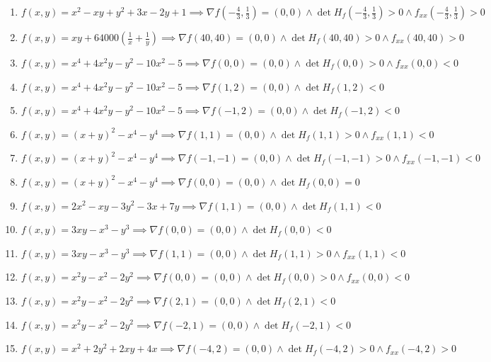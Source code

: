 \documentclass[11pt,a4paper]{article}
\begin{document}
\begin{enumerate}
\item $\displaystyle f(x, y) = x^{2} - xy + y^{2} + 3x - 2y + 1 \implies \nabla f\left( -\frac{4}{3}, \frac{1}{3} \right) = (0, 0) \land \det H_{f}\left( -\frac{4}{3}, \frac{1}{3} \right) > 0 \land f_{xx}\left( -\frac{4}{3}, \frac{1}{3} \right) > 0$
\item $\displaystyle f(x, y) = xy + 64000\left( \frac{1}{x} + \frac{1}{y} \right) \implies \nabla f(40, 40) = (0, 0) \land \det H_{f}(40, 40) > 0 \land f_{xx}(40, 40) > 0$
\item $\displaystyle f(x, y) = x^{4} + 4x^{2} y - y^{2} - 10x^{2} - 5 \implies \nabla f(0, 0) = (0, 0) \land \det H_{f}(0, 0) > 0 \land f_{xx}(0, 0) < 0$
\item $\displaystyle f(x, y) = x^{4} + 4x^{2} y - y^{2} - 10x^{2} - 5 \implies \nabla f(1, 2) = (0, 0) \land \det H_{f}(1, 2) < 0$
\item $\displaystyle f(x, y) = x^{4} + 4x^{2} y - y^{2} - 10x^{2} - 5 \implies \nabla f(-1, 2) = (0, 0) \land \det H_{f}(-1, 2) < 0$
\item $\displaystyle f(x, y) = (x + y)^{2} - x^{4} - y^{4} \implies \nabla f(1, 1) = (0, 0) \land \det H_{f}(1, 1) > 0 \land f_{xx}(1, 1) < 0$
\item $\displaystyle f(x, y) = (x + y)^{2} - x^{4} - y^{4} \implies \nabla f(-1, -1) = (0, 0) \land \det H_{f}(-1, -1) > 0 \land f_{xx}(-1, -1) < 0$
\item $\displaystyle f(x, y) = (x + y)^{2} - x^{4} - y^{4} \implies \nabla f(0, 0) = (0, 0) \land \det H_{f}(0, 0) = 0$
\item $\displaystyle f(x, y) = 2x^{2} - xy - 3y^{2} - 3x + 7y \implies \nabla f(1, 1) = (0, 0) \land \det H_{f}(1, 1) < 0$
\item $\displaystyle f(x, y) = 3xy - x^{3} - y^{3} \implies \nabla f(0, 0) = (0, 0) \land \det H_{f}(0, 0) < 0$
\item $\displaystyle f(x, y) = 3xy - x^{3} - y^{3} \implies \nabla f(1, 1) = (0, 0) \land \det H_{f}(1, 1) > 0 \land f_{xx}(1, 1) < 0$
\item $\displaystyle f(x, y) = x^{2} y - x^{2} - 2y^{2} \implies \nabla f(0, 0) = (0, 0) \land \det H_{f}(0, 0) > 0 \land f_{xx}(0, 0) < 0$
\item $\displaystyle f(x, y) = x^{2} y - x^{2} - 2y^{2} \implies \nabla f(2, 1) = (0, 0) \land \det H_{f}(2, 1) < 0$
\item $\displaystyle f(x, y) = x^{2} y - x^{2} - 2y^{2} \implies \nabla f(-2, 1) = (0, 0) \land \det H_{f}(-2, 1) < 0$
\item $\displaystyle f(x, y) = x^{2} + 2y^{2} + 2xy + 4x \implies \nabla f(-4, 2) = (0, 0) \land \det H_{f}(-4, 2) > 0 \land f_{xx}(-4, 2) > 0$

\end{enumerate}
\end{document}
